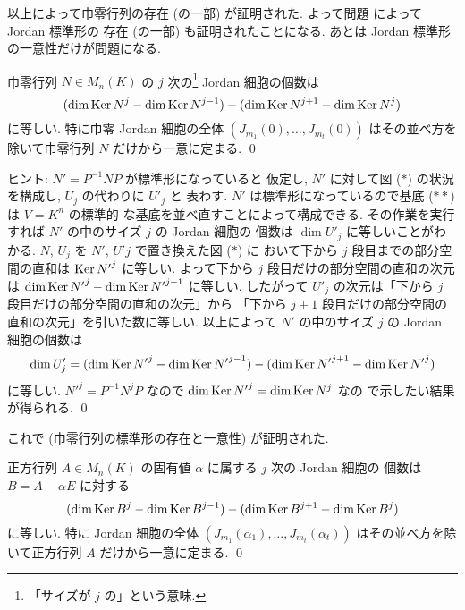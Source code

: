 \documentclass[12pt,twoside]{jarticle}
\begin{document}
\medskip

以上によって巾零行列の存在 (の一部) 
が証明された.  よって問題  によって Jordan 標準形の
存在 (の一部) も証明されたことになる.
あとは Jordan 標準形の一意性だけが問題になる.


\begin{question}
\label{q:nilp-4}
  巾零行列 $N\in M_n(K)$ の $j$ 次の\footnote{「サイズが $j$ の」という意味.}
  Jordan 細胞の個数は
  \begin{equation*}
      (\dim\mathop{\mathrm{Ker}}\nolimits N^j     - \dim\mathop{\mathrm{Ker}}\nolimits N^{j-1}) 
    - (\dim\mathop{\mathrm{Ker}}\nolimits N^{j+1} - \dim\mathop{\mathrm{Ker}}\nolimits N^j)
  \end{equation*}
  に等しい.  特に巾零 Jordan 細胞の全体 $(J_{m_1}(0),\dots,J_{m_t}(0))$ 
  はその並べ方を除いて巾零行列 $N$ だけから一意に定まる. 
  \qed
\end{question}

\noindent
ヒント: $N' = P^{-1}NP$ が標準形になっていると
仮定し, $N'$ に対して図 ($\ast$) の状況を構成し, $U_j$ の代わりに $U'_j$ と
表わす.  $N'$ は標準形になっているので基底 ($\ast\ast$) は $V=K^n$ の標準的
な基底を並べ直すことによって構成できる. 
その作業を実行すれば $N'$ の中のサイズ $j$ の Jordan 細胞の
個数は $\dim U'_j$ に等しいことがわかる.
$N$, $U_j$ を $N'$, $U'j$ で置き換えた図 ($\ast$) に
おいて下から $j$ 段目までの部分空間の直和は $\mathop{\mathrm{Ker}}\nolimits{N'}^j$ に等しい.
よって下から $j$ 段目だけの部分空間の直和の次元
は $\dim\mathop{\mathrm{Ker}}\nolimits {N'}^j - \dim\mathop{\mathrm{Ker}}\nolimits {N'}^{j-1}$ に等しい.
したがって $U'_j$ の次元は「下から $j$ 段目だけの部分空間の直和の次元」から
「下から $j+1$ 段目だけの部分空間の直和の次元」を引いた数に等しい.
以上によって $N'$ の中のサイズ $j$ の Jordan 細胞の個数は
\begin{equation*}
  \dim U'_j 
  = (\dim\mathop{\mathrm{Ker}}\nolimits {N'}^j - \dim\mathop{\mathrm{Ker}}\nolimits {N'}^{j-1}) 
  - (\dim\mathop{\mathrm{Ker}}\nolimits {N'}^{j+1} - \dim\mathop{\mathrm{Ker}}\nolimits {N'}^j)
\end{equation*}
に等しい.  ${N'}^j = P^{-1}N^jP$ なので $\dim\mathop{\mathrm{Ker}}\nolimits{N'}^j = \dim\mathop{\mathrm{Ker}}\nolimits N^j$ なの
で示したい結果が得られる.
\qed

\medskip

これで 
(巾零行列の標準形の存在と一意性) が証明された.


\begin{question}
\label{q:nilp-5}
  正方行列 $A\in M_n(K)$ の固有値 $\alpha$ に属する $j$ 次の Jordan 細胞の
  個数は $B=A-\alpha E$ に対する
  \begin{equation*}
      (\dim\mathop{\mathrm{Ker}}\nolimits B^j     - \dim\mathop{\mathrm{Ker}}\nolimits B^{j-1}) 
    - (\dim\mathop{\mathrm{Ker}}\nolimits B^{j+1} - \dim\mathop{\mathrm{Ker}}\nolimits B^j)
  \end{equation*}
  に等しい.  
  特に Jordan 細胞の全体 $(J_{m_1}(\alpha_1),\dots,J_{m_t}(\alpha_t))$ 
  はその並べ方を除いて正方行列 $A$ だけから一意に定まる. 
  \qed
\end{question}
\end{document}
